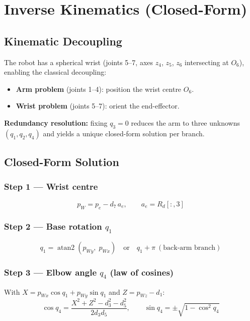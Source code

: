 \documentclass[11pt,a4paper]{article}
\begin{document}
\section{Inverse Kinematics (Closed-Form)}

\subsection{Kinematic Decoupling}
The robot has a spherical wrist (joints 5--7, axes $z_4$, $z_5$, $z_6$
intersecting at $O_6$), enabling the classical decoupling:
\begin{itemize}
  \item \textbf{Arm problem} (joints 1--4): position the wrist centre $O_6$.
  \item \textbf{Wrist problem} (joints 5--7): orient the end-effector.
\end{itemize}
\textbf{Redundancy resolution:} fixing $q_3=0$ reduces the arm to three
unknowns $(q_1,q_2,q_4)$ and yields a unique closed-form solution per branch.

\subsection{Closed-Form Solution}

\subsubsection*{Step 1 — Wrist centre}
\begin{equation}
  p_W = p_e - d_7\,a_e, \qquad a_e = R_d[:,3]
\end{equation}

\subsubsection*{Step 2 — Base rotation $q_1$}
\begin{equation}
  q_1 = \operatorname{atan2}(p_{Wy},\;p_{Wx})
  \quad\text{or}\quad q_1+\pi\ (\text{back-arm branch})
\end{equation}

\subsubsection*{Step 3 — Elbow angle $q_4$ (law of cosines)}
With $X=p_{Wx}\cos q_1+p_{Wy}\sin q_1$ and $Z=p_{Wz}-d_1$:
\begin{equation}
  \cos q_4 = \frac{X^2+Z^2-d_3^2-d_5^2}{2d_3d_5},
  \qquad \sin q_4 = \pm\sqrt{1-\cos^2 q_4}
\end{equation}
\end{document}

